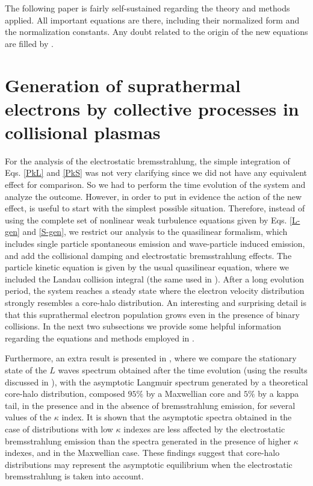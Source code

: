 \documentclass[12pt,a4paper,ruledheader]{report}
\begin{document}
The following paper is fairly self-sustained regarding the theory
and methods applied. All important equations are there, including
their normalized form and the normalization constants. Any doubt
related to the origin of the new equations are filled by
.



\section{Generation of suprathermal electrons by collective processes
  in collisional plasmas}
\label{sec:gen-supr}
For the analysis of the electrostatic bremsstrahlung, the simple integration
of Eqs. \eqref{PkL} and \eqref{PkS}
was not very clarifying since we did not have any equivalent effect for
comparison. So we had to perform the time evolution of the system and analyze
the outcome. However, in order to put in evidence the action of the new effect,
is useful to start with the simplest possible situation. Therefore, instead of
using the complete set of nonlinear weak turbulence equations given by
Eqs. \eqref{L-gen} and \eqref{S-gen}, we restrict our analysis to the
quasilinear formalism, which includes single particle spontaneous emission
and wave-particle induced emission, and add the collisional damping and
electrostatic bremsstrahlung effects. The particle kinetic equation is
given by the usual quasilinear equation, where we included the Landau
collision integral (the same used in \cite{Tigik2016a}). After a long
evolution period, the system reaches a steady state where the electron
velocity distribution strongly resembles a core-halo distribution. An
interesting and surprising detail is that this suprathermal electron
population grows even in the presence of binary collisions. In the next
two subsections we provide some helpful information regarding the equations
and methods employed in \cite{Tigik2017a}.

Furthermore, an extra result is presented in , where
we compare the stationary state of the $L$ waves spectrum obtained
after the time evolution (using the results discussed in \cite{
  Tigik2016a}), with the asymptotic Langmuir spectrum generated by
a theoretical core-halo distribution, composed $95\%$ by a Maxwellian
core and $5\%$ by a kappa tail, in the presence and in the absence of
bremsstrahlung emission, for several values of the $\kappa$ index. It is
shown that the asymptotic spectra obtained in the case of distributions
with low $\kappa$ indexes are less affected by the electrostatic
bremsstrahlung emission than the spectra generated in the presence of
higher $\kappa$ indexes, and in the Maxwellian case. These findings
suggest that core-halo distributions may represent the asymptotic
equilibrium when the electrostatic bremsstrahlung is taken into account.
\end{document}
